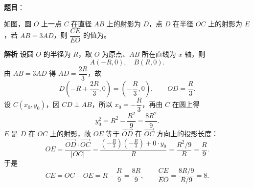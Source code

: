 \begin{answer}

\textbf{题目}：

如图，圆 $O$ 上一点 $C$ 在直径 $AB$ 上的射影为 $D$，点 $D$ 在半径 $OC$ 上的射影为 $E$，若 $AB=3AD$，则 $\dfrac{CE}{EO}$ 的值为\gkblank{}。
\nopagebreak[4]
\begin{center}\end{center}
\nopagebreak[4]
\textbf{解析}
设圆 $O$ 的半径为 $R$，取 $O$ 为原点、$AB$ 所在直线为 $x$ 轴，则
\nopagebreak[4]
\[A(-R,0),\quad B(R,0).\]
由 $AB=3AD$ 得 $AD=\dfrac{2R}{3}$，故
\nopagebreak[4]
\[D\left(-R+\frac{2R}{3},0\right)=\left(-\frac R3,0\right),\qquad OD=\frac R3.\]
设 $C(x_0,y_0)$，因 $CD\perp AB$，所以 $x_0=-\dfrac R3$，再由 $C$ 在圆上得
\nopagebreak[4]
\[y_0^2=R^2-\frac{R^2}{9}=\frac{8R^2}{9}.\]
$E$ 是 $D$ 在 $OC$ 上的射影，故 $OE$ 等于 $\overrightarrow{OD}$ 在 $\overrightarrow{OC}$ 方向上的投影长度：
\nopagebreak[4]
\[OE=\frac{\overrightarrow{OD}\cdot\overrightarrow{OC}}{|OC|}
=\frac{\left(-\frac R3\right)\left(-\frac R3\right)+0\cdot y_0}{R}
=\frac{R^2/9}{R}=\frac R9.\]
于是
\nopagebreak[4]
\[CE=OC-OE=R-\frac R9=\frac{8R}{9},\qquad
\frac{CE}{EO}=\frac{8R/9}{R/9}=8.\]


\end{answer}
